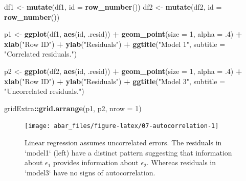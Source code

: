 \documentclass[]{book}
\newenvironment{Shaded}{\begin{snugshade}}{\end{snugshade}}
\newcommand{\DataTypeTok}[1]{\textcolor[rgb]{0.13,0.29,0.53}{#1}}
\newcommand{\DecValTok}[1]{\textcolor[rgb]{0.00,0.00,0.81}{#1}}
\newcommand{\FloatTok}[1]{\textcolor[rgb]{0.00,0.00,0.81}{#1}}
\newcommand{\KeywordTok}[1]{\textcolor[rgb]{0.13,0.29,0.53}{\textbf{#1}}}
\newcommand{\NormalTok}[1]{#1}
\newcommand{\OperatorTok}[1]{\textcolor[rgb]{0.81,0.36,0.00}{\textbf{#1}}}
\newcommand{\StringTok}[1]{\textcolor[rgb]{0.31,0.60,0.02}{#1}}
\theoremstyle{definition}
\theoremstyle{definition}
\theoremstyle{definition}
\theoremstyle{remark}
\begin{document}
\begin{Shaded}
\begin{Highlighting}[]

\NormalTok{df1 <-}\StringTok{ }\KeywordTok{mutate}\NormalTok{(df1, }\DataTypeTok{id =} \KeywordTok{row_number}\NormalTok{())}
\NormalTok{df2 <-}\StringTok{ }\KeywordTok{mutate}\NormalTok{(df2, }\DataTypeTok{id =} \KeywordTok{row_number}\NormalTok{())}

\NormalTok{p1 <-}\StringTok{ }\KeywordTok{ggplot}\NormalTok{(df1, }\KeywordTok{aes}\NormalTok{(id, .resid)) }\OperatorTok{+}\StringTok{ }
\StringTok{  }\KeywordTok{geom_point}\NormalTok{(}\DataTypeTok{size =} \DecValTok{1}\NormalTok{, }\DataTypeTok{alpha =} \FloatTok{.4}\NormalTok{) }\OperatorTok{+}
\StringTok{  }\KeywordTok{xlab}\NormalTok{(}\StringTok{"Row ID"}\NormalTok{) }\OperatorTok{+}
\StringTok{  }\KeywordTok{ylab}\NormalTok{(}\StringTok{"Residuals"}\NormalTok{) }\OperatorTok{+}
\StringTok{  }\KeywordTok{ggtitle}\NormalTok{(}\StringTok{"Model 1"}\NormalTok{,}
    \DataTypeTok{subtitle =} \StringTok{"Correlated residuals."}\NormalTok{)}

\NormalTok{p2 <-}\StringTok{ }\KeywordTok{ggplot}\NormalTok{(df2, }\KeywordTok{aes}\NormalTok{(id, .resid)) }\OperatorTok{+}\StringTok{ }
\StringTok{  }\KeywordTok{geom_point}\NormalTok{(}\DataTypeTok{size =} \DecValTok{1}\NormalTok{, }\DataTypeTok{alpha =} \FloatTok{.4}\NormalTok{) }\OperatorTok{+}
\StringTok{  }\KeywordTok{xlab}\NormalTok{(}\StringTok{"Row ID"}\NormalTok{) }\OperatorTok{+}
\StringTok{  }\KeywordTok{ylab}\NormalTok{(}\StringTok{"Residuals"}\NormalTok{) }\OperatorTok{+}
\StringTok{  }\KeywordTok{ggtitle}\NormalTok{(}\StringTok{"Model 3"}\NormalTok{,}
    \DataTypeTok{subtitle =} \StringTok{"Uncorrelated residuals."}\NormalTok{)}

\NormalTok{gridExtra}\OperatorTok{::}\KeywordTok{grid.arrange}\NormalTok{(p1, p2, }\DataTypeTok{nrow =} \DecValTok{1}\NormalTok{)}
\end{Highlighting}
\end{Shaded}

\begin{figure}

{\centering \texttt{[image: abar\_files/figure-latex/07-autocorrelation-1]} 

}

\caption{Linear regression assumes uncorrelated errors. The residuals in `model1` (left) have a distinct pattern suggesting that information about $\epsilon_1$ provides information about $\epsilon_2$.  Whereas residuals in `model3` have no signs of autocorrelation.}\label{fig:07-autocorrelation}
\end{figure}
\end{document}

